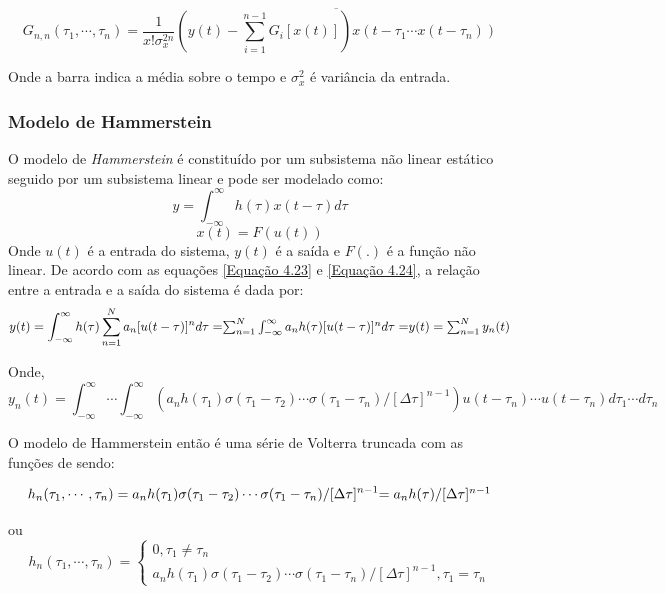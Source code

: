 \begin{equation}
G_{n,n}(\tau_{1},\cdots,\tau_{n}) = \dfrac{1}{x! \sigma_{x}^{2n}}  \overline{( y(t) - \sum_{i = 1}^{n -1}G_{i}[x(t)]) x(t-\tau_{1} \cdots x(t-\tau_{n}))}
\end{equation}

Onde a barra indica a média sobre o tempo e $\sigma_{x}^{2}$ é variância da entrada.



\subsubsection*{Modelo de Hammerstein}
O modelo de \textit{Hammerstein} é constituído por um subsistema não linear estático seguido por um subsistema linear e pode ser modelado como:
\begin{equation}
y = \int_{- \infty}^{\infty}h(\tau) x(t-\tau) d\tau
\label{Equação 4.23}
\end{equation}
\begin{equation}
x(t)=F(u(t))
\label{Equação 4.24}
\end{equation}
Onde $u(t)$ é a entrada do sistema, $y(t)$ é a saída e $F(.)$ é a função não linear. De acordo com as equações \ref{Equação 4.23} e \ref{Equação 4.24}, a relação entre a entrada e a saída do sistema é dada por:
\begin{equation}
y(t) = \int_{-\infty}^{\infty} h(\tau) \sum_{n=1}^{N}a_{n}[u(t-\tau)]^{n}d\tau =$$
$$ \sum_{n=1}^{N} \int_{-\infty}^{\infty}a_{n}h(\tau)[u(t-\tau)]^{n}d\tau =$$
$$ y(t) = \sum_{n=1}^{N} y_{n}(t)
\label{Equção 4.25}
\end{equation}

Onde,
\begin{equation}
y_{n}(t) =  \int_{-\infty}^{\infty} \cdots \int_{-\infty}^{\infty}  (a_{n}h(\tau_{1})\sigma(\tau_{1} - \tau_{2}) \cdots \sigma(\tau_{1} - \tau_{n})/[\Delta\tau]^{n-1}) u(t-\tau_{n})\cdots u(t-\tau_{n})d\tau_{1}\cdots d\tau_{n}
\label{Equação 4.26}
\end{equation}

O modelo de Hammerstein então é uma série de Volterra truncada com as funções de  sendo:

\begin{equation}
h_{n}(\tau_{1},\cdots,\tau_{n})=a_{n}h(\tau_{1})\sigma(\tau_{1} - \tau_{2}) \cdots \sigma(\tau_{1} - \tau_{n})/[\Delta\tau]^{n-1} $$
$$ = a_{n}h(\tau)/[\Delta\tau]^{n-1}
\end{equation}

ou 
\begin{equation}
h_{n}(\tau_{1},\cdots,\tau_{n}) = \left\{\begin{array}{ll} 0  , \tau_{1} \neq \tau_{n}\\ a_{n}h(\tau_{1})\sigma(\tau_{1} - \tau_{2}) \cdots \sigma(\tau_{1} - \tau_{n})/[\Delta \tau]^{n-1} , \tau_{1} = \tau_{n} \end{array}\right.
\label{Equação 4.28}
\end{equation}

